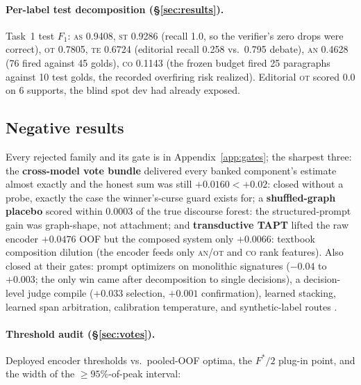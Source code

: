 \documentclass[11pt]{article}
\newcommand{\lab}[1]{\textsc{#1}}
\newcommand{\co}{\lab{co}}
\newcommand{\as}{\lab{as}}
\newcommand{\te}{\lab{te}}
\newcommand{\st}{\lab{st}}
\newcommand{\an}{\lab{an}}
\newcommand{\ot}{\lab{ot}}
\begin{document}
\paragraph{Per-label test decomposition (\S\ref{sec:results}).} Task~1
test $F_1$: \as{} 0.9408, \st{} 0.9286 (recall 1.0, so the verifier's
zero drops were correct), \ot{} 0.7805, \te{} 0.6724 (editorial recall
0.258 vs.\ 0.795 debate), \an{} 0.4628 (76 fired against 45 golds), \co{}
0.1143 (the frozen budget fired 25 paragraphs against 10 test golds, the
recorded overfiring risk realized). Editorial \ot{} scored 0.0 on 6
supports, the blind spot dev had already exposed.

\subsection{Negative results}
\label{sec:negative}

Every rejected family and its gate is in Appendix~\ref{app:gates}; the
sharpest three: the \textbf{cross-model vote bundle} delivered every
banked component's estimate almost exactly and the honest sum was still
$+0.0160 < +0.02$: closed without a probe, exactly the case the
winner's-curse guard exists for; a \textbf{shuffled-graph placebo}
scored within 0.0003 of the true discourse forest: the
structured-prompt gain was graph-shape, not attachment; and
\textbf{transductive TAPT} \citep{gururangan-etal-2020-dont} lifted the
raw encoder $+0.0476$ OOF but the composed system only
$+0.0066$: textbook composition dilution (the encoder feeds only
\an/\ot{} and \co{} rank features). Also closed at their gates: prompt
optimizers on monolithic signatures ($-0.04$ to $+0.003$; the only win
came after decomposition to single decisions), a decision-level judge
compile ($+0.033$ selection, $+0.001$ confirmation), learned stacking,
learned span arbitration, calibration temperature, and synthetic-label
routes
\citep{xu-etal-2023-supericl,fu-etal-2021-spanner,zhang-etal-2024-linkner,yung-etal-2025-synthetic,zhang-etal-2025-boxwrench,dipalo-etal-2024-pgkd,xiao-etal-2023-freeal}.

\paragraph{Threshold audit (\S\ref{sec:votes}).} Deployed encoder
thresholds vs.\ pooled-OOF optima, the $F^{*}/2$ plug-in point, and the
width of the ${\geq}95\%$-of-peak interval:
\end{document}
